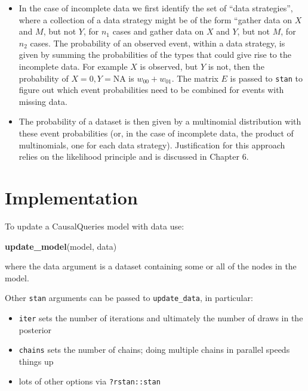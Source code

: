 \documentclass[
  12pt,
]{book}
\newenvironment{Shaded}{\begin{snugshade}}{\end{snugshade}}
\newcommand{\FunctionTok}[1]{\textcolor[rgb]{0.13,0.29,0.53}{\textbf{#1}}}
\newcommand{\NormalTok}[1]{#1}
\providecommand{\tightlist}{%
  \setlength{\itemsep}{0pt}\setlength{\parskip}{0pt}}
\begin{document}
\begin{itemize}
\item
  In the case of incomplete data we first identify the set of ``data strategies'', where a collection of a data strategy might be of the form ``gather data on \(X\) and \(M\), but not \(Y\), for \(n_1\) cases and gather data on \(X\) and \(Y\), but not \(M\), for \(n_2\) cases. The probability of an observed event, within a data strategy, is given by summing the probabilities of the types that could give rise to the incomplete data. For example \(X\) is observed, but \(Y\) is not, then the probability of \(X=0, Y = \text{NA}\) is \(w_{00} +w_{01}\). The matrix \(E\) is passed to \texttt{stan} to figure out which event probabilities need to be combined for events with missing data.
\item
  The probability of a dataset is then given by a multinomial distribution with these event probabilities (or, in the case of incomplete data, the product of multinomials, one for each data strategy). Justification for this approach relies on the likelihood principle and is discussed in Chapter 6.
\end{itemize}

\hypertarget{implementation}{%
\section{Implementation}\label{implementation}}

To update a CausalQueries model with data use:

\begin{Shaded}
\begin{Highlighting}[]
\FunctionTok{update\_model}\NormalTok{(model, data)}
\end{Highlighting}
\end{Shaded}

where the data argument is a dataset containing some or all of the nodes in the model.

Other \texttt{stan} arguments can be passed to \texttt{update\_data}, in particular:

\begin{itemize}
\tightlist
\item
  \texttt{iter} sets the number of iterations and ultimately the number of draws in the posterior
\item
  \texttt{chains} sets the number of chains; doing multiple chains in parallel speeds things up
\item
  lots of other options via \texttt{?rstan::stan}
\end{itemize}
\end{document}
